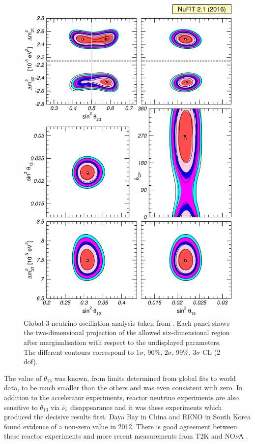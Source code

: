 \begin{figure}[p]
  \centering
  \includegraphics[width=12cm]{GlobalFit.pdf}
  \caption[Recent global 3-neutrino oscillation analysis.]{Global 3-neutrino oscillation analysis taken from \cite{NuFit2014,NuFit2017}. Each panel shows the two-dimensional projection of the allowed six-dimensional region after marginalisation with respect to the undisplayed parameters. The different contours correspond to 1$\sigma$, 90\%, 2$\sigma$, 99\%, 3$\sigma$ CL (2 dof).}
  \label{fig:GlobalFit}
\end{figure}

The value of $\theta_{13}$ was known, from limits determined from global fits to world data, to be much smaller than the others and was even consistent with zero.  In addition to the accelerator experiments, reactor neutrino experiments are also sensitive to $\theta_{13}$ via $\bar{\nu}_e$ disappearance and it was these experiments which produced the decisive results first.  Daya Bay \cite{DayaBay2012} in China and RENO \cite{RENO2012} in South Korea found evidence of a non-zero value in 2012.  There is good agreement between these reactor experiments and more recent measurements from T2K \cite{T2Knue2014} and NO$\nu$A \cite{NOvAnue2016}.


